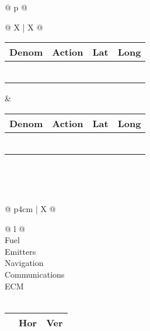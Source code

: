 \begin{adjustbox}{width={\textwidth},totalheight={\textheight}}
{\begin{tabularx}{\textwidth}{ @{} p{\linewidth} @{} }
	\\[-3ex] \midrule
	{\begin{tabularx}{\textwidth}{@{} X | X @{}}
		{\begin{tabularx}{\linewidth}{@{} *{4}X @{}}
			Denom & Action & Lat & Long\\[-3ex] \midrule
			\hfill & \hfill & \hfill & \hfill\\ \midrule
			\hfill & \hfill & \hfill & \hfill\\ \midrule
			\hfill & \hfill & \hfill & \hfill\\ \midrule
			\hfill & \hfill & \hfill & \hfill\\ \midrule
			\hfill & \hfill & \hfill & \hfill\\ \midrule
			\hfill & \hfill & \hfill & \hfill\\
		\end{tabularx}} &
		{\begin{tabularx}{\linewidth}{@{} *{4}X @{}}
			Denom & Action & Lat & Long\\[-3ex] \midrule
			\hfill & \hfill & \hfill & \hfill\\ \midrule
			\hfill & \hfill & \hfill & \hfill\\ \midrule
			\hfill & \hfill & \hfill & \hfill\\ \midrule
			\hfill & \hfill & \hfill & \hfill\\ \midrule
			\hfill & \hfill & \hfill & \hfill\\ \midrule
			\hfill & \hfill & \hfill & \hfill\\
		\end{tabularx}}\\
	\end{tabularx}}\\ \midrule
	{\begin{tabularx}{\textwidth}{@{} p{4cm} | X @{}}
		\begin{tabular}[t]{@{} l @{}}
			\\[-3ex] \midrule
			Fuel\\[-3ex]
			Emitters\\[-3ex]
			Navigation\\[-3ex]
			Communications\\[-3ex]
			ECM\\[-3ex]
			\midrule
			\\[-3ex] \midrule
			{\begin{tabularx}{\linewidth}{@{} r X X @{}}
				& \textbf{Hor} & \textbf{Ver}\\[-3ex] \midrule

\end{tabularx}}
\end{tabular}
\end{tabularx}}
\end{tabularx}}
\end{adjustbox}

